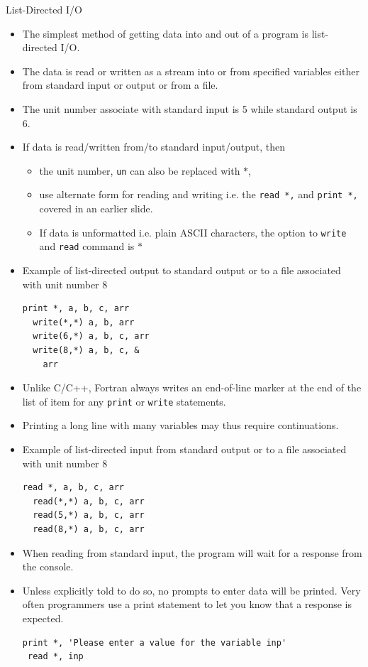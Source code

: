 \documentclass[c,mathserif,compress,xcolor=svgnames]{beamer}
\newcommand{\lstfortran}[1]{\lstinline[language={[90]Fortran},basicstyle=\footnotesize\ttfamily]|#1|}
\begin{document}
\begin{frame}{List-Directed I/O}
  \begin{itemize}
    \item The simplest method of getting data into and out of a program is list-directed I/O.
    \item The data is read or written as a stream into or from specified variables either from standard input or output or from a file.
    \item The unit number associate with standard input is 5 while standard output is 6.
    \item If data is read/written from/to standard input/output, then
      \begin{itemize}
        \item the unit number, \lstfortran{un} can also be replaced with $\ast$,
        \item use alternate form for reading and writing i.e. the \lstfortran{read *,} and \lstfortran{print *,} covered in an earlier slide.
        \item If data is unformatted i.e. plain ASCII characters, the option to \lstfortran{write} and \lstfortran{read} command is $\ast$
      \end{itemize}
    \item Example of list-directed output to standard output or to a file associated with unit number 8
      \begin{lstlisting}[language={[90]Fortran}]
  print *, a, b, c, arr
  write(*,*) a, b, arr
  write(6,*) a, b, c, arr
  write(8,*) a, b, c, &
    arr
      \end{lstlisting}
    \item Unlike C/C++, Fortran always writes an end-of-line marker at the end of the list of item for any \lstfortran{print} or \lstfortran{write} statements.
    \item Printing a long line with many variables may thus require continuations.
    \item Example of list-directed input from standard output or to a file associated with unit number 8
      \begin{lstlisting}[language={[90]Fortran}]
  read *, a, b, c, arr
  read(*,*) a, b, c, arr
  read(5,*) a, b, c, arr
  read(8,*) a, b, c, arr
      \end{lstlisting}
    \item When reading from standard input, the program will wait for a response from the console.
    \item Unless explicitly told to do so, no prompts to enter data will be printed. Very often programmers use a print statement to let you know that a response is expected.
      \begin{lstlisting}[language={[90]Fortran}]
 print *, 'Please enter a value for the variable inp'
 read *, inp
      \end{lstlisting}
  \end{itemize}
\end{frame}
\end{document}
